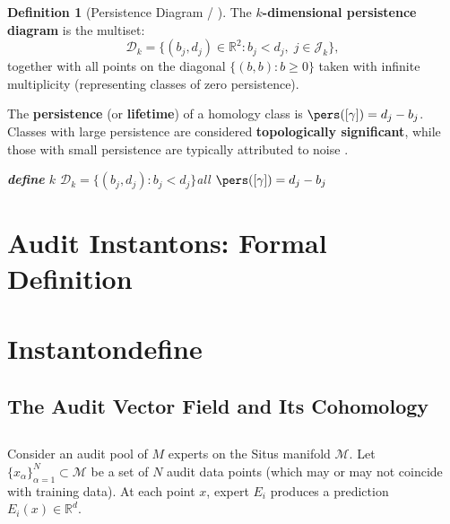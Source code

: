 \documentclass[11pt,a4paper]{article}
\theoremstyle{plain}
\theoremstyle{definition}
\newtheorem{definition}[theorem]{Definition}
\newcommand{\R}{\mathbb{R}}
\newcommand{\cM}{\mathcal{M}}
\newcommand{\cD}{\mathcal{D}}
\begin{document}
\begin{definition}[Persistence Diagram / ]
The \textbf{$k$-dimensional persistence diagram} is the multiset:
\begin{equation}
  \cD_k = \{(b_j, d_j) \in \R^2 : b_j < d_j, \; j \in \mathcal{J}_k\},
  \label{eq:pers_diagram}
\end{equation}
together with all points on the diagonal $\{(b, b) : b \geq 0\}$ taken with 
infinite multiplicity (representing classes of zero persistence).

The \textbf{persistence} (or \textbf{lifetime}) of a homology class is 
$\pers([\gamma]) = d_j - b_j$. Classes with large persistence are 
considered \textbf{topologically significant}, while those with small 
persistence are typically attributed to noise \cite{chazal2017}.
\end{definition}

\bigskip
\noindent
\textit{\textbf{define} $k$ \textbf{} $\cD_k = \{(b_j, d_j) : b_j < d_j\}$all\textbf{}\textbf{} $\pers([\gamma]) = d_j - b_j$\textbf{}}

\section{Audit Instantons: Formal Definition}
\section*{Instantondefine}

\subsection{The Audit Vector Field and Its Cohomology}
\subsection*{}

Consider an audit pool of $M$ experts on the Situs manifold $\cM$. Let 
$\{x_{\alpha}\}_{\alpha=1}^{N} \subset \cM$ be a set of $N$ audit data 
points (which may or may not coincide with training data). At each point 
$x$, expert $E_i$ produces a prediction $E_i(x) \in \R^d$.
\end{document}
